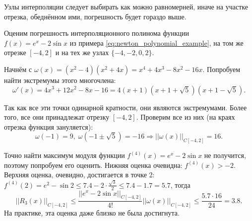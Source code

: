 \documentclass[../main.tex]{subfile}
\begin{document}
Узлы интерполяции следует выбирать как можно равномерней, иначе на участке
отрезка, обеднённом ими, погрешность будет гораздо выше.

\begin{example}
	Оценим погрешность интерполяционного полинома функции $f(x)=e^x-2\sin x$
	из примера \eqref{eq:newton_polynomial_example}, на том
	же отрезке $[-4,2]$ и на тех же узлах $\{-4,-2,0,2\}$.

	Начнём с $\omega(x)=(x^2-4)(x^2+4x)=x^4+4x^3-8x^2-16x$. Попробуем найти
	экстремумы этого многочлена:
	\[\omega'(x)=4x^3+12x^2-8x-16=4(x+1)(x+1+\sqrt 5)(x+1-\sqrt 5).\]

	Так как все эти точки одинарной кратности, они являются экстремумами.
	Более того, все они принадлежат отрезку $[-4,2]$. Проверим все из них
	(на краях отрезка функция зануляется):
	\[\omega(-1)=9,\;\omega(-1\pm\sqrt 5)=-16\Rightarrow
	||\omega(x)||_{C[-4,2]}=16.\]

	Точно найти максимум модуля функции $f^{(4)}(x)=e^x-2\sin x$ не
	получится, поэтому попробуем его оценить. Нижняя оценка очевидна:
	$f^{(4)}(x)>-2$. Верхняя оценка, очевидно, достигается в точке 2:
	$f^{(4)}(2)=e^2-\sin 2\le 7.4-2\cdot\frac{\sqrt 3}{2}\le 7.4-1.7=5.7$,
	тогда
	\[||R_3(x)||_{C[-4,2]}\le\frac{||e^x-2\sin x||_{C[-4,2]}}{4!}
	||\omega(x)||_{C[-4,2]}\le\frac{5.7\cdot 16}{24}=3.8.\]
	На практике, эта оценка даже близко не была достигнута.
\end{example}
\end{document}
